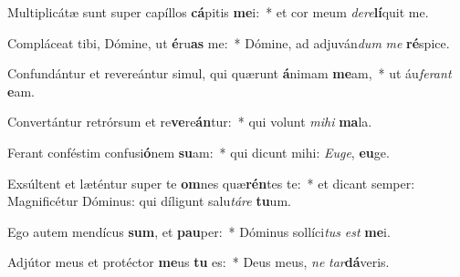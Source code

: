 \item Multiplicátæ sunt super capíllos \textbf{cá}pitis \textbf{me}i:~* et cor meum \textit{de}\textit{re}\textbf{lí}quit me.
\item Compláceat tibi, Dómine, ut \textbf{é}ru\textbf{as} me:~* Dómine, ad adjuván\textit{dum} \textit{me} \textbf{ré}spice.
\item Confundántur et revereántur simul, qui quærunt \textbf{á}nimam \textbf{me}am,~* ut áu\textit{fe}\textit{rant} \textbf{e}am.
\item Convertántur retrórsum et re\textbf{ve}re\textbf{án}tur:~* qui volunt \textit{mi}\textit{hi} \textbf{ma}la.
\item Ferant conféstim confusi\textbf{ó}nem \textbf{su}am:~* qui dicunt mihi: \textit{Eu}\textit{ge}, \textbf{eu}ge.
\item Exsúltent et læténtur super te \textbf{om}nes quæ\textbf{rén}tes te:~* et dicant semper: Magnificétur Dóminus: qui díligunt salu\textit{tá}\textit{re} \textbf{tu}um.
\item Ego autem mendícus \textbf{sum}, et \textbf{pau}per:~* Dóminus sollíci\textit{tus} \textit{est} \textbf{me}i.
\item Adjútor meus et protéctor \textbf{me}us \textbf{tu} es:~* Deus meus, \textit{ne} \textit{tar}\textbf{dá}veris.
